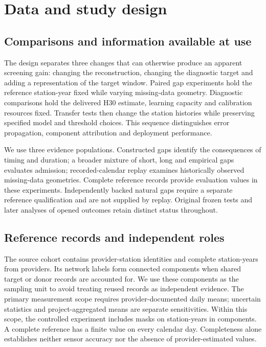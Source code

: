 \section{Data and study design}

\subsection{Comparisons and information available at use}

The design separates three changes that can otherwise produce an apparent screening gain: changing the reconstruction, changing the diagnostic target and adding a representation of the target window. Paired gap experiments hold the reference station-year fixed while varying missing-data geometry. Diagnostic comparisons hold the delivered H30 estimate, learning capacity and calibration resources fixed. Transfer tests then change the station histories while preserving specified model and threshold choices. This sequence distinguishes error propagation, component attribution and deployment performance.

We use three evidence populations. Constructed gaps identify the consequences of timing and duration; a broader mixture of short, long and empirical gaps evaluates admission; recorded-calendar replay examines historically observed missing-data geometries. Complete reference records provide evaluation values in these experiments. Independently backed natural gaps require a separate reference qualification and are not supplied by replay. Original frozen tests and later analyses of opened outcomes retain distinct status throughout.

\subsection{Reference records and independent roles}

The source cohort contains \RSourceStations{} provider-station identities and \RSourceYears{} complete station-years from \RSourceProviders{} providers. Its \RSourceNetworks{} network labels form \RSourceGroups{} connected components when shared target or donor records are accounted for. We use these components as the sampling unit to avoid treating reused records as independent evidence. The primary measurement scope requires provider-documented daily means; uncertain statistics and project-aggregated means are separate sensitivities. Within this scope, the controlled experiment includes \RDocumentedControlledCases{} masks on \RDocumentedYears{} station-years in \RDocumentedGroups{} components. A complete reference has a finite value on every calendar day. Completeness alone establishes neither sensor accuracy nor the absence of provider-estimated values.

